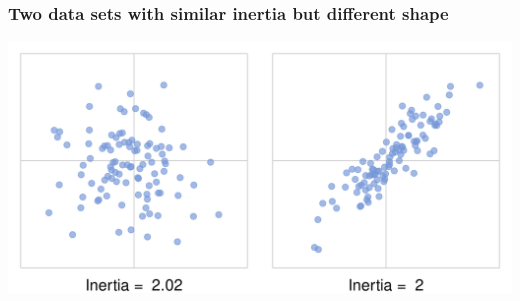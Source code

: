\documentclass[12pt]{beamer}\usepackage[]{graphicx}\usepackage[]{color}
\newenvironment{knitrout}{}{} %
\begin{document}

\begin{frame}[fragile]
\frametitle{Two data sets with similar inertia but different shape}



\begin{knitrout}\footnotesize
{}\color{fgcolor}

{\centering \includegraphics[width=1\linewidth,height=.5\linewidth]{figure/inertia_clouds-1} 

}



\end{knitrout}

\end{frame}

\end{document}
